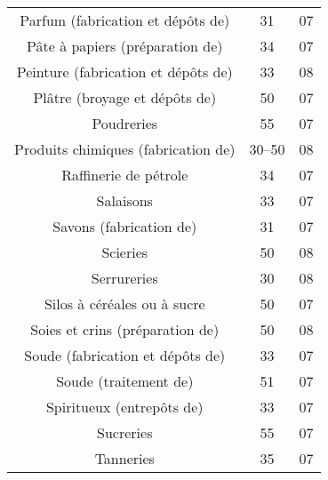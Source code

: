 \begin{minipage}[t]{0.49\linewidth}
\begin{tabularx}{\textwidth}[t]{c X c c}
\multicolumn{2}{p{4.8cm}}{Parfum (fabrication et dépôts de)}													&	31			&	07 \\	
\multicolumn{2}{p{4.8cm}}{Pâte à papiers (préparation de)}													&	34			&	07 \\	
\multicolumn{2}{p{4.8cm}}{Peinture (fabrication et dépôts de)}												&	33			&	08 \\	
\multicolumn{2}{p{4.8cm}}{Plâtre (broyage et dépôts de)}														&	50			&	07 \\	
\multicolumn{2}{p{4.8cm}}{Poudreries}																					&	55			&	07 \\	
\multicolumn{2}{p{4.8cm}}{Produits chimiques (fabrication de)}												&	30--50	&	08 \\	
\multicolumn{2}{p{4.8cm}}{Raffinerie de pétrole}																	&	34			&	07 \\	
\multicolumn{2}{p{4.8cm}}{Salaisons}																					&	33			&	07 \\	
\multicolumn{2}{p{4.8cm}}{Savons (fabrication de)}																&	31			&	07 \\	
\multicolumn{2}{p{4.8cm}}{Scieries}																						&	50			&	08 \\	
\multicolumn{2}{p{4.8cm}}{Serrureries}																					&	30			&	08 \\	
\multicolumn{2}{p{4.8cm}}{Silos à céréales ou à sucre}															&	50			&	07 \\	
\multicolumn{2}{p{4.8cm}}{Soies et crins (préparation de)}														&	50			&	08 \\	
\multicolumn{2}{p{4.8cm}}{Soude (fabrication et dépôts de)}													&	33			&	07 \\	
\multicolumn{2}{p{4.8cm}}{Soude (traitement de)}																		&	51			&	07 \\	
\multicolumn{2}{p{4.8cm}}{Spiritueux (entrepôts de)}																&	33			&	07 \\	
\multicolumn{2}{p{4.8cm}}{Sucreries}																					&	55			&	07 \\	
\multicolumn{2}{p{4.8cm}}{Tanneries}																					&	35			&	07 \\	
\end{tabularx}
\end{minipage}
\hfill

